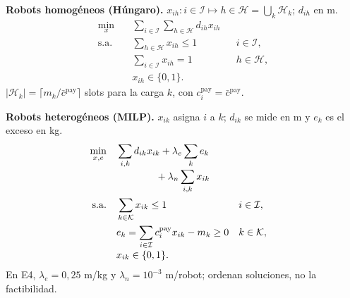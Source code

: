 \documentclass[12pt,a4paper]{article}
\begin{document}
{\small
\begin{minipage}[t]{0.48\textwidth}
\textbf{Robots homogéneos (Húngaro).}
{\footnotesize $x_{ih}\colon i\in\mathcal I\mapsto
h\in\mathcal H=\bigcup_k\mathcal H_k$; $d_{ih}$ en m.}
\begin{equation}
\label{eq:sp1-homogeneous-model}
\begin{aligned}
\min_{x}\quad
  &\sum_{i\in\mathcal I}\sum_{h\in\mathcal H}d_{ih}x_{ih}\\
\mathrm{s.a.}\quad
  &\sum_{h\in\mathcal H}x_{ih}\leq1 && i\in\mathcal I,\\
  &\sum_{i\in\mathcal I}x_{ih}=1 && h\in\mathcal H,\\[-1mm]
  &x_{ih}\in\{0,1\}.
\end{aligned}
\end{equation}
$|\mathcal H_k|=\lceil m_k/\bar c^{\mathrm{pay}}\rceil$ slots para la carga
$k$, con $c_i^{\mathrm{pay}}=\bar c^{\mathrm{pay}}$.
\end{minipage}\hfill
\begin{minipage}[t]{0.48\textwidth}
\textbf{Robots heterogéneos (MILP).}
{\footnotesize $x_{ik}$ asigna $i$ a $k$; $d_{ik}$ se mide en m y $e_k$ es el
exceso en kg.}
\begin{equation}
\label{eq:sp1-heterogeneous-model}
\begin{aligned}
\min_{x,e}\quad
  &\sum_{i,k}d_{ik}x_{ik}+\lambda_e\sum_k e_k\\[-1mm]
  &\hspace{14mm}+\lambda_n\sum_{i,k}x_{ik}\\
\mathrm{s.a.}\quad
  &\sum_{k\in\mathcal K}x_{ik}\leq1 && i\in\mathcal I,\\
  &e_k=\sum_{i\in\mathcal I}c_i^{\mathrm{pay}}x_{ik}-m_k\geq0
    && k\in\mathcal K,\\[-1mm]
  &x_{ik}\in\{0,1\}.
\end{aligned}
\end{equation}
{\footnotesize En E4, $\lambda_e=0{,}25$ m/kg y
$\lambda_n=10^{-3}$ m/robot; ordenan soluciones, no la factibilidad.}
\end{minipage}
}
\end{document}
